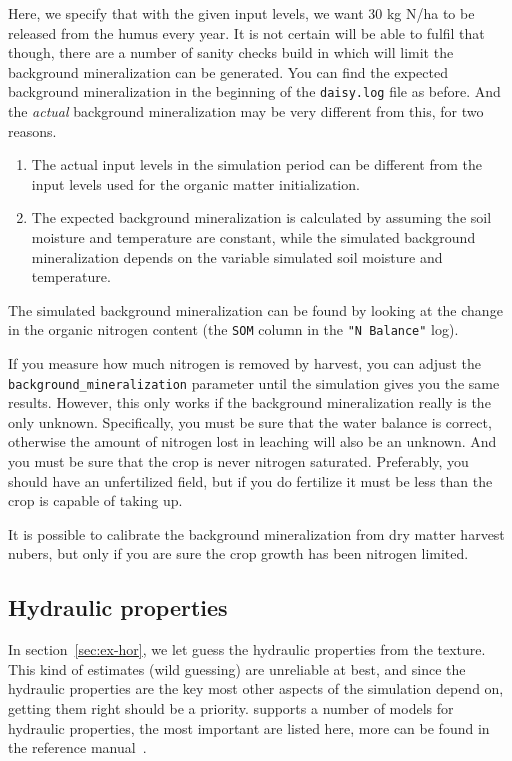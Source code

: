 \documentclass[a4paper,11pt]{article}
\begin{document}
Here, we specify that with the given input levels, we want 30 kg N/ha
to be released from the humus every year.  It is not certain \daisy{}
will be able to fulfil that though, there are a number of sanity
checks build in which will limit the background mineralization can be
generated.  You can find the expected background mineralization in the
beginning of the \texttt{daisy.log} file as before.  And the
\emph{actual} background mineralization may be very different from
this, for two reasons.
\begin{enumerate}
\item The actual input levels in the simulation period can be
  different from the input levels used for the organic matter
  initialization.
\item The expected background mineralization is calculated by assuming
  the soil moisture and temperature are constant, while the simulated
  background mineralization depends on the variable simulated soil
  moisture and temperature.
\end{enumerate}
The simulated background mineralization can be found by looking at the
change in the organic nitrogen content (the \texttt{SOM} column in the
\texttt{"N Balance"} log).

If you measure how much nitrogen is removed by harvest, you can adjust
the \texttt{background\_mineralization} parameter until the simulation
gives you the same results.  However, this only works if the
background mineralization really is the only unknown.  Specifically,
you must be sure that the water balance is correct, otherwise the
amount of nitrogen lost in leaching will also be an unknown.  And you
must be sure that the crop is never nitrogen saturated.  Preferably,
you should have an unfertilized field, but if you do fertilize it must
be less than the crop is capable of taking up.

It is possible to calibrate the background mineralization from dry
matter harvest nubers, but only if you are sure the crop growth has
been nitrogen limited.

\subsection{Hydraulic properties}
\label{sec:hydraulic}

In section~\ref{sec:ex-hor}, we let \daisy{} guess the hydraulic
properties from the texture.  This kind of estimates (wild guessing)
are unreliable at best, and since the hydraulic properties are the key
most other aspects of the simulation depend on, getting them right
should be a priority.  \Daisy{} supports a number of models for
hydraulic properties, the most important are listed here, more can be
found in the reference manual~\cite{dina81}.
\end{document}
